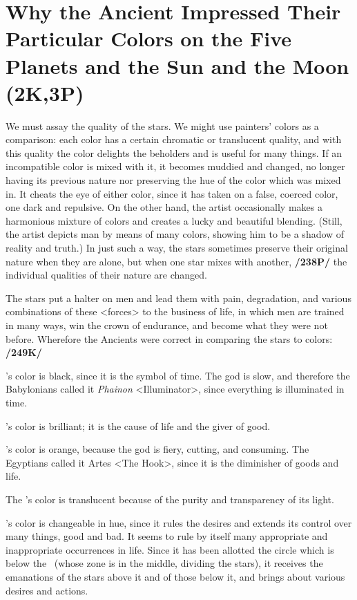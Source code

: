 \section{Why the Ancient Impressed Their Particular Colors on the Five Planets and the Sun and the Moon (2K,3P)}

We must assay the quality of the stars. We might use painters’ colors as a comparison: each color has a certain chromatic or translucent quality, and with this quality the color delights the beholders and is
useful for many things. If an incompatible color is mixed with it, it becomes muddied and changed, no longer having its previous nature nor preserving the hue of the color which was mixed in. It cheats the eye of either color, since it has taken on a false, coerced color, one dark and repulsive. On the other hand, the artist occasionally makes a harmonious mixture of colors and creates a lucky and beautiful blending. (Still, the artist depicts man by means of many colors, showing him to be a shadow of reality and truth.) In just such a way, the stars sometimes preserve their original nature when they are alone, but when one star mixes with another, \textbf{/238P/} the individual qualities of their nature are changed. 

The stars put a halter on men and lead them with pain, degradation, and various combinations of these <forces> to the business of life, in which men are trained in many ways, win the crown of endurance, and become what they were not before. Wherefore the Ancients were correct in comparing the stars to colors: \textbf{/249K/}

\Saturn’s color is black, since it is the symbol of time. The god is slow, and therefore the Babylonians called it \textit{Phainon} <Illuminator>, since everything is illuminated in time.

\Jupiter’s color is brilliant; it is the cause of life and the giver of good.

\Mars’s color is orange, because the god is fiery, cutting, and consuming. The Egyptians called it Artes <The Hook>, since it is the diminisher of goods and life.

The \Sun's color is translucent because of the purity and transparency of its light.

\Venus’s color is changeable in hue, since it rules the desires and extends its control over many things, good and bad. It seems to rule by itself many appropriate and inappropriate occurrences in life. Since it has been allotted the circle which is below the \Sun\, (whose zone is in the middle, dividing the stars), it receives the emanations of the stars above it and of those below it, and brings about various desires and actions.

